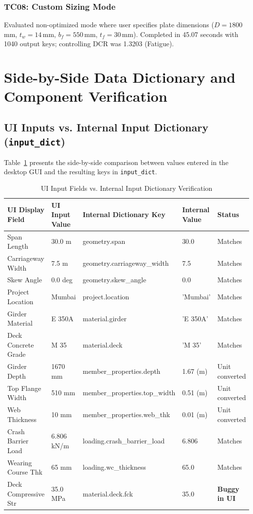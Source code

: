 \documentclass[11pt,a4paper]{article}
\begin{document}
\subsubsection{TC08: Custom Sizing Mode}
Evaluated non-optimized mode where user specifies plate dimensions ($D = 1800$\,mm, $t_w = 14$\,mm, $b_f = 550$\,mm, $t_f = 30$\,mm). Completed in 45.07 seconds with 1040 output keys; controlling DCR was 1.3203 (Fatigue).

\newpage
\section{Side-by-Side Data Dictionary and Component Verification}

\subsection{UI Inputs vs. Internal Input Dictionary (\texttt{input\_dict})}
Table~\ref{tab:input_mapping} presents the side-by-side comparison between values entered in the desktop GUI and the resulting keys in \texttt{input\_dict}.

\begin{table}[H]
\centering
\scriptsize
\setlength{\tabcolsep}{4pt}
\renewcommand{\arraystretch}{1.15}
\caption{UI Input Fields vs. Internal Input Dictionary Verification}
\label{tab:input_mapping}
\begin{tabularx}{\textwidth}{p{3.2cm} p{1.8cm} >{\raggedright\arraybackslash\ttfamily}p{5.5cm} p{2.2cm} X}
\toprule
\textbf{UI Display Field} & \textbf{UI Input Value} & \rmfamily\textbf{Internal Dictionary Key} & \textbf{Internal Value} & \textbf{Status} \\
\midrule
Span Length & 30.0 m & geometry.span & 30.0 & Matches \\
Carriageway Width & 7.5 m & geometry.carriageway\_width & 7.5 & Matches \\
Skew Angle & 0.0 deg & geometry.skew\_angle & 0.0 & Matches \\
Project Location & Mumbai & project.location & 'Mumbai' & Matches \\
Girder Material & E 350A & material.girder & 'E 350A' & Matches \\
Deck Concrete Grade & M 35 & material.deck & 'M 35' & Matches \\
Girder Depth & 1670 mm & member\_properties.depth & 1.67 (m) & Unit converted \\
Top Flange Width & 510 mm & member\_properties.top\_width & 0.51 (m) & Unit converted \\
Web Thickness & 10 mm & member\_properties.web\_thk & 0.01 (m) & Unit converted \\
Crash Barrier Load & 6.806 kN/m & loading.crash\_barrier\_load & 6.806 & Matches \\
Wearing Course Thk & 65 mm & loading.wc\_thickness & 65.0 & Matches \\
Deck Compressive Str & 35.0 MPa & material.deck.fck & 35.0 & \textbf{Buggy in UI} \\
\bottomrule
\end{tabularx}
\end{table}
\end{document}
